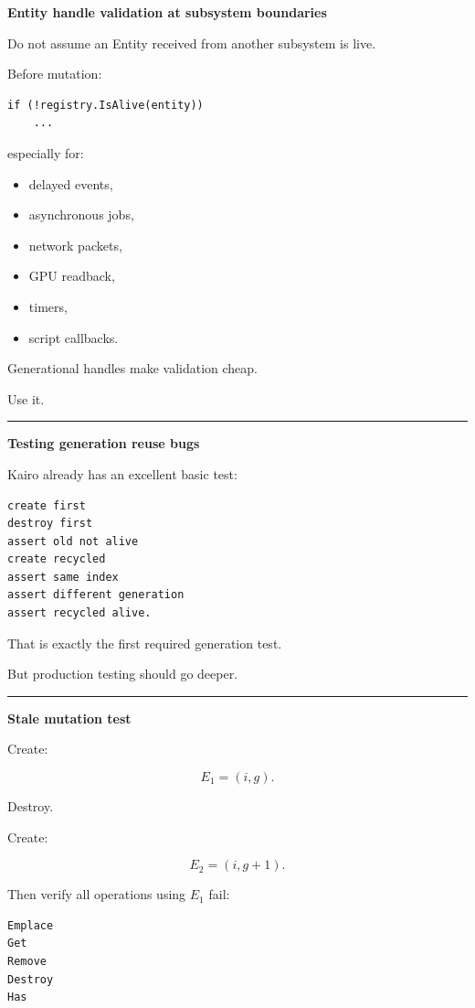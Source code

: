 \textbf{Entity handle validation at subsystem boundaries}

Do not assume an Entity received from another subsystem is live.

Before mutation:

\begin{verbatim}
if (!registry.IsAlive(entity))
    ...
\end{verbatim}

especially for:

\begin{itemize}
\tightlist
\item
  delayed events,
\item
  asynchronous jobs,
\item
  network packets,
\item
  GPU readback,
\item
  timers,
\item
  script callbacks.
\end{itemize}

Generational handles make validation cheap.

Use it.

\begin{center}\rule{0.5\linewidth}{0.5pt}\end{center}

\textbf{Testing generation reuse bugs}

Kairo already has an excellent basic test:

\begin{verbatim}
create first
destroy first
assert old not alive
create recycled
assert same index
assert different generation
assert recycled alive.
\end{verbatim}

That is exactly the first required generation test.

But production testing should go deeper.

\begin{center}\rule{0.5\linewidth}{0.5pt}\end{center}

\textbf{Stale mutation test}

Create:

\[
E_1=(i,g).
\]

Destroy.

Create:

\[
E_2=(i,g+1).
\]

Then verify all operations using \(E_1\) fail:

\begin{verbatim}
Emplace
Get
Remove
Destroy
Has
\end{verbatim}


